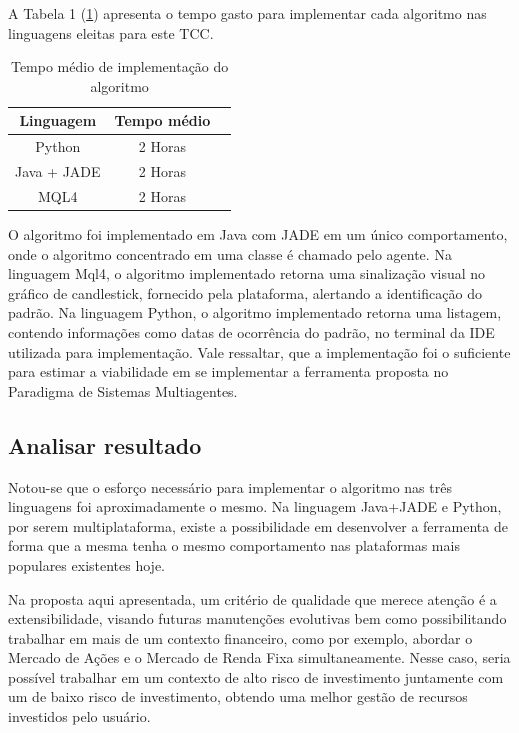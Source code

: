 A Tabela 1 (\ref{t01}) apresenta o tempo gasto para implementar cada algoritmo nas linguagens eleitas para este TCC.

\begin{table}[h]
	\centering
	\label{t01}
	
	\begin{tabular}{ccc}
		\toprule
		\textbf{Linguagem} & \textbf{Tempo médio}\\
		\midrule
		Python & 2 Horas  \\
		Java + JADE & 2 Horas  \\
		MQL4 & 2 Horas  \\
		\bottomrule
	\end{tabular}

	\caption{Tempo médio de implementação do algoritmo}
\end{table}

O algoritmo foi implementado em Java com JADE em um único comportamento, onde o algoritmo concentrado em uma classe é chamado pelo agente. Na linguagem Mql4, o algoritmo implementado retorna uma sinalização visual no gráfico de candlestick, fornecido pela plataforma, alertando a identificação do padrão. Na linguagem Python, o algoritmo implementado retorna uma listagem, contendo informações como datas de ocorrência do padrão, no terminal da IDE utilizada para implementação. Vale ressaltar, que a implementação foi o suficiente para estimar a viabilidade em se implementar a ferramenta proposta no Paradigma de Sistemas Multiagentes.


\subsection{Analisar resultado}

Notou-se que o esforço necessário para implementar o algoritmo nas três linguagens foi aproximadamente o mesmo. Na linguagem Java+JADE e Python, por serem multiplataforma, existe a possibilidade em desenvolver a ferramenta de forma que a mesma tenha o mesmo comportamento nas plataformas mais populares existentes hoje.

Na proposta aqui apresentada, um critério de qualidade que merece atenção é a extensibilidade, visando futuras manutenções evolutivas bem como possibilitando trabalhar em mais de um contexto financeiro, como por exemplo, abordar o Mercado de Ações e o Mercado de Renda Fixa simultaneamente. Nesse caso, seria possível trabalhar em um contexto de alto risco de investimento juntamente com um de baixo risco de investimento, obtendo uma melhor gestão de recursos investidos pelo usuário.

